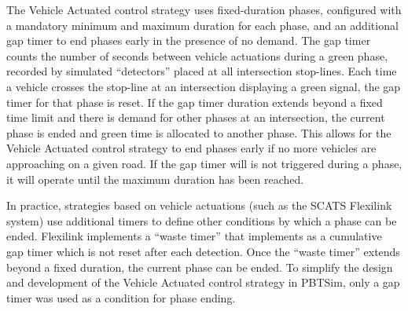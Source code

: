 The Vehicle Actuated control strategy uses fixed-duration phases, configured with a mandatory minimum and maximum duration for each phase, and an additional gap timer to end phases early in the presence of no demand. The gap timer counts the number of seconds between vehicle actuations during a green phase, recorded by simulated ``detectors'' placed at all intersection stop-lines. Each time a vehicle crosses the stop-line at an intersection displaying a green signal, the gap timer for that phase is reset. If the gap timer duration extends beyond a fixed time limit and there is demand for other phases at an intersection, the current phase is ended and green time is allocated to another phase. This allows for the Vehicle Actuated control strategy to end phases early if no more vehicles are approaching on a given road. If the gap timer will is not triggered during a phase, it will operate until the maximum duration has been reached.

In practice, strategies based on vehicle actuations (such as the SCATS Flexilink system) use additional timers to define other conditions by which a phase can be ended. Flexilink implements a ``waste timer'' that implements as a cumulative gap timer which is not reset after each detection. Once the ``waste timer'' extends beyond a fixed duration, the current phase can be ended. To simplify the design and development of the Vehicle Actuated control strategy in PBTSim, only a gap timer was used as a condition for phase ending.  


